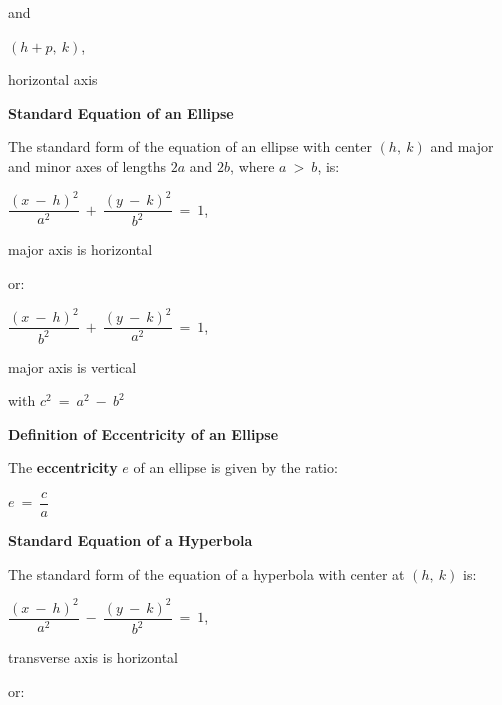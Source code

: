 \documentclass{article}
\begin{document}
\begin{large}
\hspace{0.1in} and

\vspace{-0.3in}
\hspace{2.5in} $(h+p,\ k)$, \begin{Large} horizontal axis \end{Large}

\textbf{Standard Equation of an Ellipse}

\hspace{0.1in} The standard form of the equation of an ellipse with center $(h,\ k)$ and major and minor axes of lengths $2a$ and $2b$, where $a\ >\ b$, is:

\hspace{2.0in} $\dfrac{(x\ -\ h)^{2}}{a^{2}}\ +\ \dfrac{(y\ -\ k)^{2}}{b^{2}}\ =\ 1$, \begin{Large} major axis is horizontal \end{Large}

\hspace{0.1in} or:

\hspace{2.0in} $\dfrac{(x\ -\ h)^{2}}{b^{2}}\ +\ \dfrac{(y\ -\ k)^{2}}{a^{2}}\ =\ 1$, \begin{Large} major axis is vertical \end{Large}

\hspace{0.1in} with $c^{2}\ =\ a^{2}\ -\ b^{2}$

\vspace{0.1in}
\textbf{Definition of Eccentricity of an Ellipse}

\hspace{0.1in} The \textbf{eccentricity} $e$ of an ellipse is given by the ratio:

\hspace{1.5in} $e\ =\ \dfrac{c}{a}$

\textbf{Standard Equation of a Hyperbola}

\hspace{0.1in} The standard form of the equation of a hyperbola with center at $(h,\ k)$ is:

\hspace{1.0in} $\dfrac{(x\ -\ h)^{2}}{a^{2}}\ -\ \dfrac{(y\ -\ k)^{2}}{b^{2}}\ =\ 1$, \begin{Large} transverse axis is horizontal \end{Large}

\hspace{0.1in} or:


\end{large}
\end{document}
